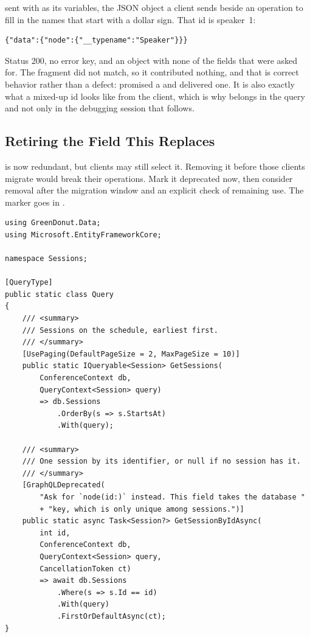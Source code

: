 sent with  as its variables, the JSON object a
client sends beside an operation to fill in the names that start with a
dollar sign. That id is speaker~1:

\begin{verbatim}
{"data":{"node":{"__typename":"Speaker"}}}
\end{verbatim}

Status 200, no error key, and an object with none of the fields that were
asked for. The fragment did not match, so it contributed nothing, and that is
correct behavior rather than a defect:  promised a  and
delivered one. It is also exactly what a mixed-up id looks like from the
client, which is why  belongs in the query and not only in
the debugging session that follows.

\subsection{Retiring the Field This Replaces}

%
 is now redundant, but clients may still select it. Removing
it before those clients migrate would break their operations. Mark it
deprecated now, then consider removal after the migration window and an
explicit check of remaining use. The marker goes in .

\begin{verbatim}
using GreenDonut.Data;
using Microsoft.EntityFrameworkCore;

namespace Sessions;

[QueryType]
public static class Query
{
    /// <summary>
    /// Sessions on the schedule, earliest first.
    /// </summary>
    [UsePaging(DefaultPageSize = 2, MaxPageSize = 10)]
    public static IQueryable<Session> GetSessions(
        ConferenceContext db,
        QueryContext<Session> query)
        => db.Sessions
            .OrderBy(s => s.StartsAt)
            .With(query);

    /// <summary>
    /// One session by its identifier, or null if no session has it.
    /// </summary>
    [GraphQLDeprecated(
        "Ask for `node(id:)` instead. This field takes the database "
        + "key, which is only unique among sessions.")]
    public static async Task<Session?> GetSessionByIdAsync(
        int id,
        ConferenceContext db,
        QueryContext<Session> query,
        CancellationToken ct)
        => await db.Sessions
            .Where(s => s.Id == id)
            .With(query)
            .FirstOrDefaultAsync(ct);
}
\end{verbatim}

